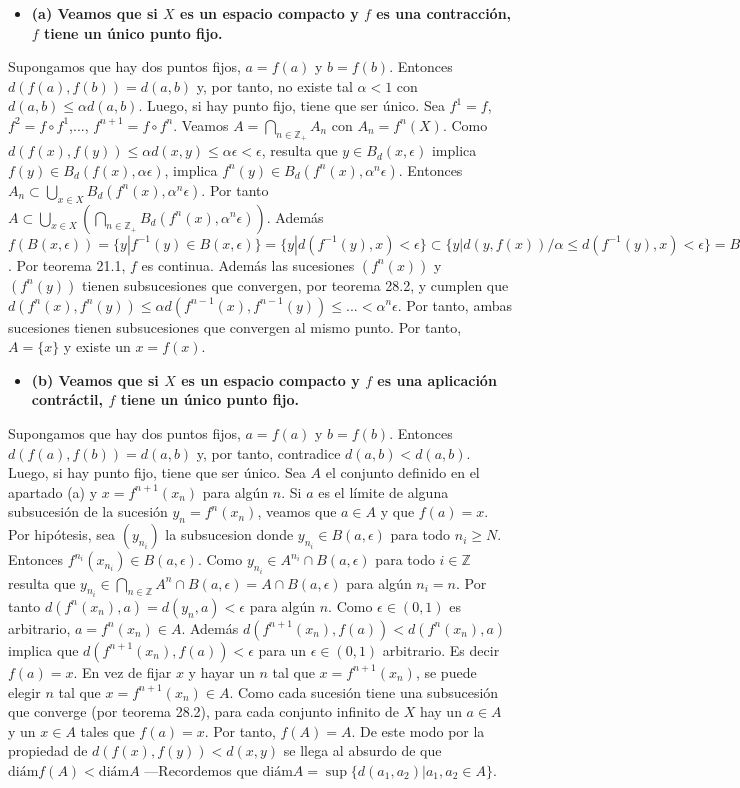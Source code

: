 \documentclass{article}
\begin{document}
\begin{itemize}
\item \bf (a) \rm Veamos que si $X$ es un espacio compacto y $f$ es una contracción, $f$ tiene un único punto fijo.
\end{itemize}
Supongamos que hay dos puntos fijos, $a=f(a)$ y $b=f(b)$. Entonces $d(f(a),f(b))=d(a,b)$ y, por tanto, no existe tal $\alpha<1$ con $d(a,b)\leq\alpha d(a,b)$. Luego, si hay punto fijo, tiene que ser único.
Sea $f^1=f$, $f^2=f\circ f^1$,..., $f^{n+1}=f\circ f^n$. Veamos $A=\bigcap_{n\in \mathbb{Z}_+}A_n$ con $A_n=f^n(X)$. Como $d(f(x),f(y))\leq\alpha d(x,y)\leq\alpha\epsilon<\epsilon$, resulta que $y\in B_d(x,\epsilon)$ implica $f(y)\in B_d( f(x),\alpha\epsilon)$, implica $f^n(y)\in B_d( f^n(x),\alpha^n\epsilon)$. Entonces $A_n\subset\bigcup_{x\in X}B_d( f^n(x),\alpha^n\epsilon)$. Por tanto $A\subset\bigcup_{x\in X}\left(\bigcap_{n\in \mathbb{Z}_+}B_d( f^n(x),\alpha^n\epsilon)\right)$. Además $f(B(x,\epsilon))=\{y|f^{-1}(y)\in B(x,\epsilon)\}=\{y|d(f^{-1}(y),x)<\epsilon\}\subset\{y|d(y,f(x))/\alpha\leq d(f^{-1}(y),x)<\epsilon\}=B(f(x),\alpha\epsilon)$. Por teorema 21.1, $f$ es continua. Además las sucesiones $(f^n(x))$ y $(f^n(y))$ tienen subsucesiones que convergen, por teorema 28.2, y cumplen que $d(f^n(x),f^n(y))\leq \alpha d(f^{n-1}(x),f^{n-1}(y))\leq...<\alpha^n\epsilon$. Por tanto, ambas sucesiones tienen subsucesiones que convergen al mismo punto. Por tanto, $A=\{x\}$ y existe un $x=f(x)$.
\begin{itemize}
\item \bf (b) \rm Veamos que si $X$ es un espacio compacto y $f$ es una aplicación contráctil, $f$ tiene un único punto fijo.
\end{itemize}
Supongamos que hay dos puntos fijos, $a=f(a)$ y $b=f(b)$. Entonces $d(f(a),f(b))=d(a,b)$ y, por tanto, contradice $d(a,b)< d(a,b)$. Luego, si hay punto fijo, tiene que ser único. Sea $A$ el conjunto definido en el apartado (a) y $x=f^{n+1}(x_n)$ para algún $n$. Si $a$ es el límite de alguna subsucesión de la sucesión $y_n=f^n(x_n)$, veamos que $a\in A$ y que $f(a)=x$. Por hipótesis, sea $(y_{n_i})$ la subsucesion donde $y_{n_i}\in B(a,\epsilon)$ para todo $n_i\geq N$. Entonces $f^{n_i}(x_{n_i})\in B(a,\epsilon)$. Como $y_{n_i}\in A^{n_i}\cap B(a,\epsilon)$ para todo $i\in \mathbb{Z}$ resulta que $y_{n_i}\in \bigcap_{n\in \mathbb{Z}}A^{n}\cap B(a,\epsilon) = A\cap B(a,\epsilon)$ para algún $n_i=n$. Por tanto $d(f^{n}(x_{n}),a)=d(y_{n},a)<\epsilon$ para algún $n$. Como $\epsilon\in (0,1)$ es arbitrario, $a=f^{n}(x_n)\in A$. Además $d(f^{n+1}(x_{n}),f(a))<d(f^{n}(x_{n}),a)$ implica que $d(f^{n+1}(x_{n}),f(a))<\epsilon$ para un $\epsilon\in (0,1)$ arbitrario. Es decir $f(a)=x$. En vez de fijar $x$ y hayar un $n$ tal que $x=f^{n+1}(x_n)$, se puede elegir $n$ tal que $x=f^{n+1}(x_n)\in A$. Como cada sucesión tiene una subsucesión que converge (por teorema 28.2), para cada conjunto infinito de $X$ hay un $a\in A$ y un $x\in A$ tales que $f(a)=x$. Por tanto, $f(A)=A$. De este modo por la propiedad de $d(f(x),f(y))<d(x,y)$ se llega al absurdo de que $\text{diám}f(A)< \text{diám}A$ ---Recordemos que $\text{diám}A =\sup \{d(a_1,a_2)|a_1,a_2\in A\}$.
\end{document}
